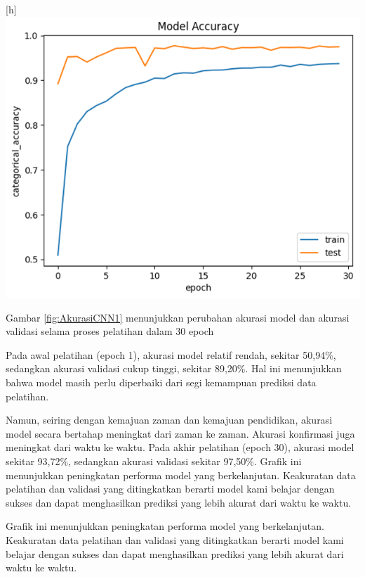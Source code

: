 \begin{center}[h]
	\includegraphics[width=0.7\linewidth]{gambar/bener/Accuracy_ModelCNN.png}
	\label{fig:AkurasiCNN1}
\end{center}
Gambar \ref{fig:AkurasiCNN1} menunjukkan perubahan akurasi model dan akurasi validasi selama proses pelatihan dalam 30 epoch

Pada awal pelatihan (epoch 1), akurasi model relatif rendah, sekitar 50,94\%, sedangkan akurasi validasi cukup tinggi, sekitar 89,20\%. Hal ini menunjukkan bahwa model masih perlu diperbaiki dari segi kemampuan prediksi data pelatihan.

Namun, seiring dengan kemajuan zaman dan kemajuan pendidikan, akurasi model secara bertahap meningkat dari zaman ke zaman. Akurasi konfirmasi juga meningkat dari waktu ke waktu. Pada akhir pelatihan (epoch 30), akurasi model sekitar 93,72\%, sedangkan akurasi validasi sekitar 97,50\%. Grafik ini menunjukkan peningkatan performa model yang berkelanjutan. Keakuratan data pelatihan dan validasi yang ditingkatkan berarti model kami belajar dengan sukses dan dapat menghasilkan prediksi yang lebih akurat dari waktu ke waktu.

Grafik ini menunjukkan peningkatan performa model yang berkelanjutan. Keakuratan data pelatihan dan validasi yang ditingkatkan berarti model kami belajar dengan sukses dan dapat menghasilkan prediksi yang lebih akurat dari waktu ke waktu.  

